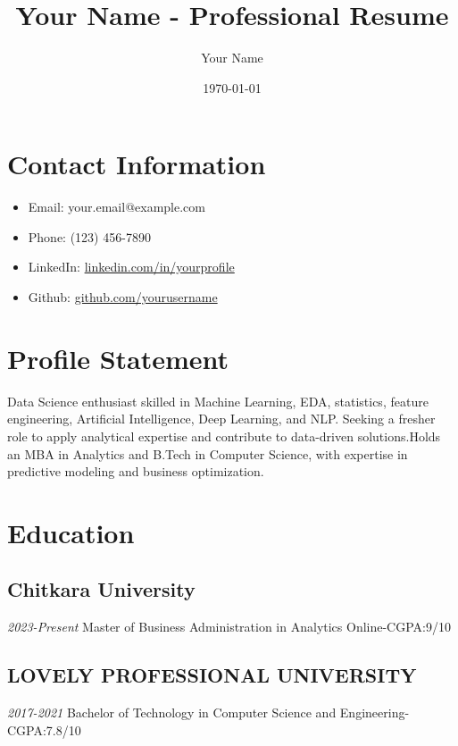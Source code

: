 \documentclass{article}
\title{Your Name - Professional Resume}
\author{Your Name}
\date{\today}
\begin{document}
\maketitle

\section{Contact Information}
\begin{itemize}
    \item Email: your.email@example.com
    \item Phone: (123) 456-7890
    \item LinkedIn: \href{https://linkedin.com/in/yourprofile}{linkedin.com/in/yourprofile}
    \item Github: \href{https://github.com/yourusername}{github.com/yourusername}
\end{itemize}

\section{Profile Statement}
Data Science enthusiast skilled in Machine Learning, EDA, statistics, feature engineering, Artificial Intelligence, Deep Learning, and NLP. Seeking a fresher role to apply analytical expertise and contribute to data-driven solutions.Holds an MBA in Analytics and B.Tech in Computer Science, with expertise in predictive modeling and business optimization.


\section{Education}
\subsection{Chitkara University}                          \textit{2023-Present}
Master of Business Administration in Analytics Online-CGPA:9/10

\subsection{LOVELY PROFESSIONAL UNIVERSITY}               \textit{2017-2021}
Bachelor of Technology in Computer Science and Engineering-CGPA:7.8/10
\end{document}
